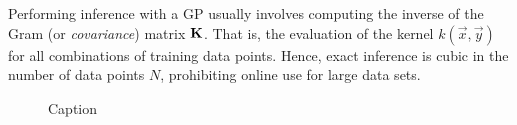 
Performing inference with a \ac{GP} usually involves computing the inverse of the Gram (or \emph{covariance}) matrix $\bm{\mathrm{K}}$.
That is, the evaluation of the kernel $k(\vec{x}, \vec{y})$ for all combinations of training data points.
Hence, exact inference is cubic in the number of data points $N$, prohibiting online use for large data sets\cite{rahimiRandomFeaturesLargeScale2007}.


\begin{figure}
    \centering
    \caption{Caption}
    \label{fig:my_label}
\end{figure}
